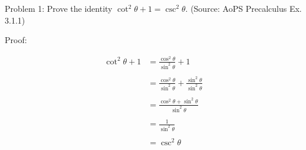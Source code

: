 Problem 1: Prove the identity $\cot^2 \theta + 1 = \csc^2\theta$. (Source: AoPS Precalculus Ex. 3.1.1)

Proof:

\begin{align*}
\cot^2 \theta + 1 &= \frac{\cos^2 \theta}{\sin^2 \theta} + 1 \\ \\
&= \frac{\cos^2 \theta}{\sin^2 \theta} + \frac{\sin^2 \theta}{\sin^2 \theta} \\ \\
&= \frac{\cos^2 \theta + \sin^2 \theta}{\sin^2 \theta} \\ \\
&= \frac{1}{\sin^2 \theta} \\ \\
&= \boxed{\csc^2 \theta}
\end{align*}
